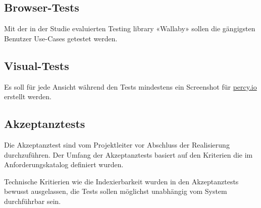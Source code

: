 \subsection{Browser-Tests}\label{browsertests}

Mit der in der Studie evaluierten Testing \Gls{library} «Wallaby» sollen die
gängigsten Benutzer Use-Cases getestet werden.

\subsection{Visual-Tests}\label{visualtests}

Es soll für jede Ansicht während den Tests mindestens ein Screenshot für
\href{https://percy.io/}{percy.io} erstellt werden.

\clearpage
\subsection{Akzeptanztests}\label{akzeptanztests}

Die Akzeptanztest sind vom Projektleiter vor Abschluss der Realisierung
durchzuführen. Der Umfang der Akzeptanztests basiert auf den Kriterien die im
Anforderungskatalog definiert wurden.

Technische Kritierien wie die Indexierbarkeit wurden in den Akzeptanztests
bewusst ausgelassen, die Tests sollen möglichst unabhängig vom System
durchführbar sein.



